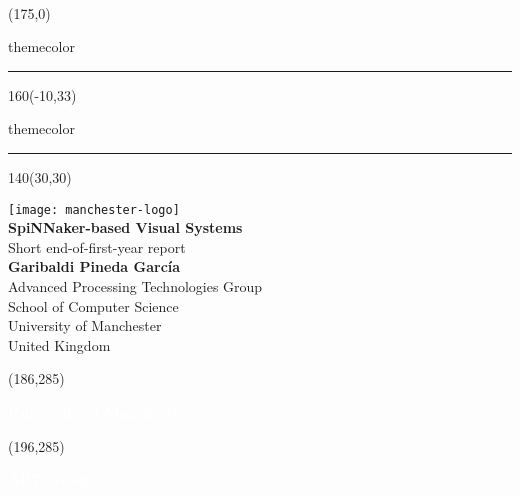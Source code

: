 \setlength{\TPHorizModule}{1mm}
\setlength{\TPVertModule}{1mm}
\begin{titlepage}
  ~
  \begin{textblock}{50}(175,0)
    \begin{color}{themecolor}
      \rule{3cm}{30cm}
    \end{color}
  \end{textblock}

  \begin{textblock}{160}(-10,33)
    \begin{color}{themecolor}
      \rule{160cm}{2.2cm}
    \end{color}
  \end{textblock}
  
  \begin{textblock}{140}(30,30)
    \begin{flushright}
    \texttt{[image: manchester-logo]}\\[5em]
    
    {\noindent\Huge\bfseries SpiNNaker-based Visual Systems}\\[2em]
    
    {\noindent\huge Short end-of-first-year report }\\[5em]
    
    {\noindent\Large\bfseries Garibaldi Pineda Garc\'ia}\\

    {\noindent\Large Advanced Processing Technologies Group\\
      School of Computer Science \\
      University of Manchester\\[0.4em]
      United Kingdom}
    \end{flushright}
  \end{textblock}
  
  
  \begin{textblock}{20}(186,285)
    \begin{rotate}{90}
      {\huge\bfseries \textcolor{white}{University of Manchester}}
    \end{rotate}
  \end{textblock}
  \begin{textblock}{20}(196,285)
    \begin{rotate}{90}
      {\huge\bfseries \textcolor{white}{APT Group}}
    \end{rotate}
  \end{textblock}  

  
\end{titlepage}
